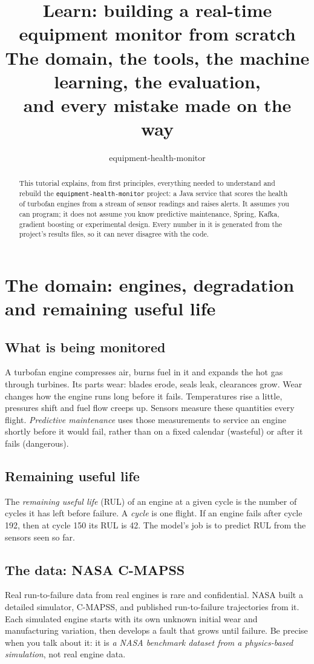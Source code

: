 \documentclass[11pt,a4paper]{article}
\title{\textbf{Learn: building a real-time equipment monitor from scratch}\\[0.4em]
\large The domain, the tools, the machine learning, the evaluation,\\and every mistake made on the way}
\author{equipment-health-monitor}
\date{}
\begin{document}
\maketitle
\begin{abstract}
This tutorial explains, from first principles, everything needed to understand and rebuild the
\texttt{equipment-health-monitor} project: a Java service that scores the health of turbofan engines from a stream
of sensor readings and raises alerts. It assumes you can program; it does not assume you know predictive
maintenance, Spring, Kafka, gradient boosting or experimental design. Every number in it is generated from the
project's results files, so it can never disagree with the code.
\end{abstract}
\tableofcontents
\newpage

\section{The domain: engines, degradation and remaining useful life}

\subsection{What is being monitored}
A turbofan engine compresses air, burns fuel in it and expands the hot gas through turbines. Its parts wear:
blades erode, seals leak, clearances grow. Wear changes how the engine runs long before it fails. Temperatures
rise a little, pressures shift and fuel flow creeps up. Sensors measure these quantities every flight.
\emph{Predictive maintenance} uses those measurements to service an engine shortly before it would fail, rather
than on a fixed calendar (wasteful) or after it fails (dangerous).

\subsection{Remaining useful life}
The \emph{remaining useful life} (RUL) of an engine at a given cycle is the number of cycles it has left before
failure. A \emph{cycle} is one flight. If an engine fails after cycle 192, then at cycle 150 its RUL is 42. The
model's job is to predict RUL from the sensors seen so far.

\subsection{The data: NASA C-MAPSS}
Real run-to-failure data from real engines is rare and confidential. NASA built a detailed simulator, C-MAPSS,
and published run-to-failure trajectories from it. Each simulated engine starts with its own unknown initial
wear and manufacturing variation, then develops a fault that grows until failure. Be precise when you talk
about it: it is \emph{a NASA benchmark dataset from a physics-based simulation}, not real engine data.
\end{document}
